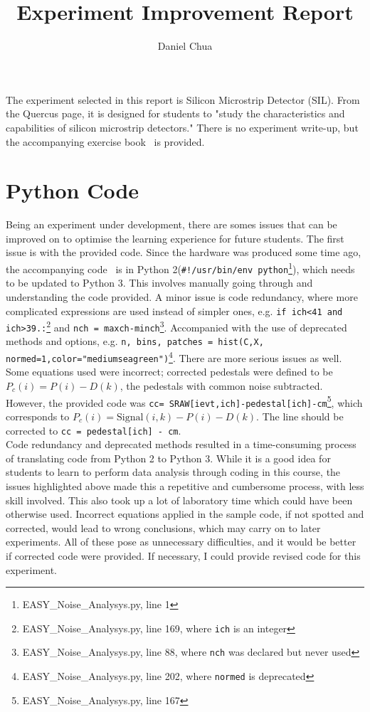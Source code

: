 \documentclass[12pt]{article}
\title{Experiment Improvement Report}
\author{Daniel Chua}
\begin{document}
\maketitle

The experiment selected in this report is Silicon Microstrip Detector (SIL). From the Quercus page, it is designed for students to "study the characteristics and capabilities of silicon microstrip detectors." There is no experiment write-up, but the accompanying exercise book~\cite{manual} is provided.

\section{Python Code}

Being an experiment under development, there are somes issues that can be improved on to optimise the learning experience for future students. The first issue is with the provided code. Since the hardware was produced some time ago, the accompanying code~\cite{code} is in Python 2(\lstinline|#!/usr/bin/env python|\footnote{EASY\_Noise\_Analysys.py, line 1}), which needs to be updated to Python 3. This involves manually going through and understanding the code provided. A minor issue is code redundancy, where more complicated expressions are used instead of simpler ones, e.g. \lstinline|if ich<41 and ich>39.:|\footnote{EASY\_Noise\_Analysys.py, line 169, where \lstinline|ich| is an integer} and \lstinline|nch = maxch-minch|\footnote{EASY\_Noise\_Analysys.py, line 88, where \lstinline|nch| was declared but never used}. Accompanied with the use of deprecated methods and options, e.g. \lstinline|n, bins, patches = hist(C,X, normed=1,color="mediumseagreen")|\footnote{EASY\_Noise\_Analysys.py, line 202, where \lstinline|normed| is deprecated}. There are more serious issues as well. Some equations used were incorrect; corrected pedestals were defined to be $P_c(i) = P(i) - D(k)$, the pedestals with common noise subtracted. However, the provided code was \lstinline|cc= SRAW[ievt,ich]-pedestal[ich]-cm|\footnote{EASY\_Noise\_Analysys.py, line 167}, which corresponds to $P_c(i) = \text{Signal}(i,k) - P(i) - D(k)$. The line should be corrected to \lstinline|cc = pedestal[ich] - cm|. \\

Code redundancy and deprecated methods resulted in a time-consuming process of translating code from Python 2 to Python 3. While it is a good idea for students to learn to perform data analysis through coding in this course, the issues highlighted above made this a repetitive and cumbersome process, with less skill involved. This also took up a lot of laboratory time which could have been otherwise used. Incorrect equations applied in the sample code, if not spotted and corrected, would lead to wrong conclusions, which may carry on to later experiments. All of these pose as unnecessary difficulties, and it would be better if corrected code were provided. If necessary, I could provide revised code for this experiment. \\
\end{document}
